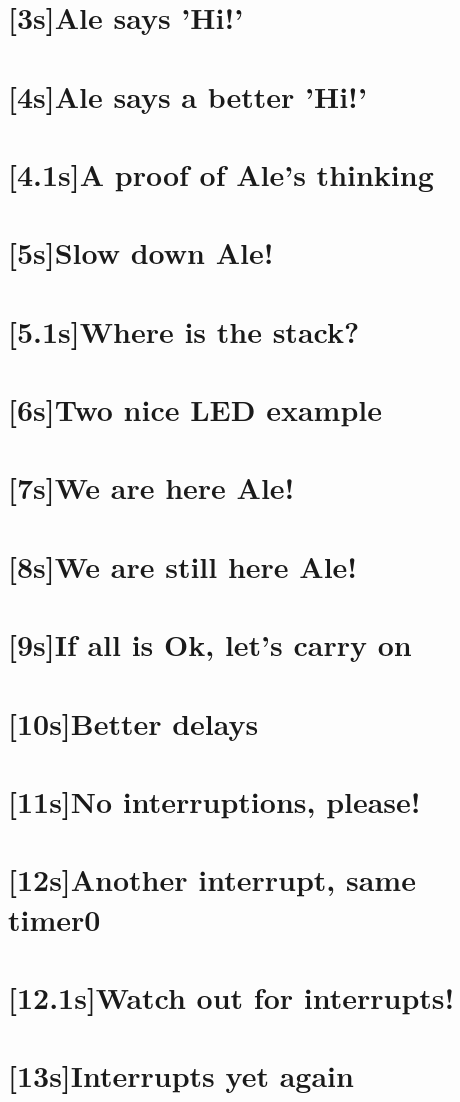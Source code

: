 \documentclass[12pt, a4paper]{book}
\begin{document}
\section{[3s]Ale says 'Hi!'}
\section{[4s]Ale says a better 'Hi!'}
\section{[4.1s]A proof of Ale's thinking}
\section{[5s]Slow down Ale!}
\section{[5.1s]Where is the stack?}
\section{[6s]Two nice LED example}
\section{[7s]We are here Ale!}
\section{[8s]We are still here Ale!}
\section{[9s]If all is Ok, let's carry on}
\section{[10s]Better delays}
\section{[11s]No interruptions, please!}
\section{[12s]Another interrupt, same timer0}
\section{[12.1s]Watch out for interrupts!}
\section{[13s]Interrupts yet again}
\end{document}
